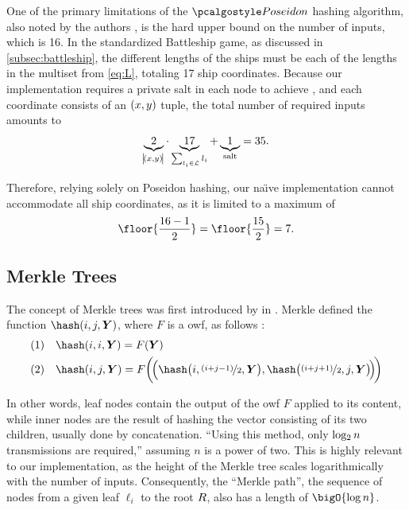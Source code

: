 One of the primary limitations of the $\poseidon$ hashing algorithm, also noted by the authors \cite[\ppno~8, 29]{grassi19}, is the hard upper bound on the number of inputs, which is 16. In the standardized Battleship game, as discussed in \cref{subsec:battleship}, the different lengths of the ships must be each of the lengths in the multiset from \cref{eq:L}, totaling 17 ship coordinates. Because our implementation requires a private salt in each node to achieve , and each coordinate consists of an $\left(x, y\right)$ tuple, the total number of required inputs amounts to
\begin{equation*}
    \underbrace{2}_{\abs{\!\left(x, y\right)\!}} \cdot \underbrace{17}_{\sum_{l_i \in \mathcal{L}} l_i} + \underbrace{1}_{\text{salt}} = 35.
\end{equation*}

\noindent Therefore, relying solely on Poseidon hashing, our na{\"\i}ve implementation cannot accommodate all ship coordinates, as it is limited to a maximum of
\begin{equation}\label{eq:naiveCoords}
    \floor{\frac{16 - 1}{2}} = \floor{\frac{15}{2}} = 7.
\end{equation}

\subsection{Merkle Trees}
\label{subsec:merkle}

The concept of Merkle trees was first introduced by \textcite{merkle90} in \citeyear{merkle90}. Merkle defined the function $\hash\del{i, j, \vect{Y}}$, where $F$ is a \gls{owf}, as follows \cite[\pno~228]{merkle90}:
\begin{equation}\label{eq:merkle}
    \begin{split}
        &\del{1} \quad \hash\del{i, i, \vect{Y}} = F\del{\vect{Y}} \\
        &\del{2} \quad \hash\del{i, j, \vect{Y}} = F\del{\dellr{\hash\del{i, \nicefrac{\del{i + j - 1}}{2}, \vect{Y}}, \hash\delr{\nicefrac{\del{i + j + 1}}{2}, j, \vect{Y}}}}
    \end{split}
\end{equation}

\noindent In other words, leaf nodes contain the output of the \gls{owf} $F$ applied to its content, while inner nodes are the result of hashing the vector consisting of its two children, usually done by concatenation. \enquote{Using this method, only $\operatorname{log_2} n$ transmissions are required,} \cite[\pno~228]{merkle90} assuming $n$ is a power of two. This is highly relevant to our implementation, as the height of the Merkle tree scales logarithmically with the number of inputs. Consequently, the \enquote{Merkle path}, the sequence of nodes from a given leaf $\ell_i$ to the root $R$, also has a length of $\bigO{\log n}$.

